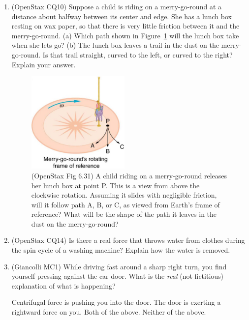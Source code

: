 \documentclass[10pt,twocolumn]{exam}
\begin{document}
\begin{questions}
\begin{enumerate}[resume*]
  \item (OpenStax CQ10) Suppose a child is riding on a merry-go-round at a distance about halfway between its center and edge. She has a lunch box resting on wax paper, so that there is very little friction between it and the merry-go-round. (a) Which path shown in Figure~\ref{6.31} will the lunch box take when she lets go? (b) The lunch box leaves a trail in the dust on the merry-go-round. Is that trail straight, curved to the left, or curved to the right? Explain your answer.
    \begin{figure}[h]
      \centering
      \includegraphics[width=5cm]{6-31.jpg}
      \caption{(OpenStax Fig  6.31) A child riding on a merry-go-round releases her lunch box at point P. This is a view from above the clockwise rotation. Assuming it slides with negligible friction, will it follow path A, B, or C, as viewed from Earth's frame of reference? What will be the shape of the path it leaves in the dust on the merry-go-round?}
      \label{6.31}
    \end{figure}

  
  \item (OpenStax CQ14) Is there a real force that throws water from clothes during the spin cycle of a washing machine? Explain how the water is removed.
  \item (Giancolli MC1) While driving fast around a sharp right turn, you find yourself pressing against the car door. What is the \emph{real} (not fictitious) explanation of what is happening?
  \begin{choices}
    \choice Centrifugal force is pushing you into the door.
    \choice The door is exerting a rightward force on you.
    \choice Both of the above.
    \choice Neither of the above.
  \end{choices}
\end{enumerate}

\vs\pagebreak

\end{questions}
\end{document}
